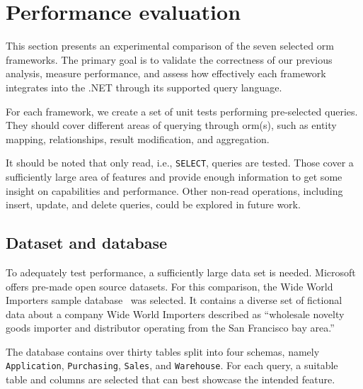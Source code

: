 \section{Performance evaluation}
\label{sec:perf_eval}

This section presents an experimental comparison of the seven selected \acrshort{orm} frameworks. The primary goal is to validate the correctness of our previous analysis, measure performance, and assess how effectively each framework integrates into the .NET through its supported query language.

For each framework, we create a set of unit tests performing pre-selected queries. They should cover different areas of querying through \acrshort{orm}(s), such as entity mapping, relationships, result modification, and aggregation.

It should be noted that only read, i.e., \texttt{SELECT}, queries are tested. Those cover a sufficiently large area of features and provide enough information to get some insight on capabilities and performance. Other non-read operations, including insert, update, and delete queries, could be explored in future work.

\subsection{Dataset and database}
\label{sec:dataset_database}
To adequately test performance, a sufficiently large data set is needed. Microsoft offers pre-made open source datasets.
For this comparison, the Wide World Importers sample database~\cite{microsoftWWI} was selected.
It contains a diverse set of fictional data about a company Wide World Importers described as ``wholesale novelty goods importer and distributor operating from the San Francisco bay area.''~\cite{microsoftWWI}

The database contains over thirty tables split into four schemas, namely \texttt{Application}, \texttt{Purchasing}, \texttt{Sales}, and \texttt{Warehouse}. For each query, a suitable table and columns are selected that can best showcase the intended feature.

